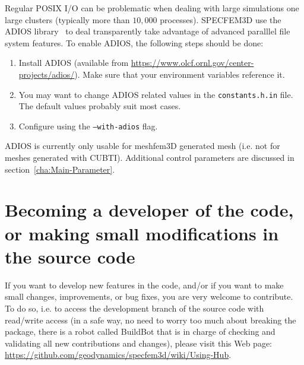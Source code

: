 Regular POSIX I/O can be problematic when dealing with large simulations one large
clusters (typically more than $10,000$ processes). SPECFEM3D use the ADIOS library~\cite{Liu2013}
to deal transparently take advantage of advanced paralllel file system features. To enable
ADIOS, the following steps should be done:
\begin{enumerate}
\item Install ADIOS (available from \url{https://www.olcf.ornl.gov/center-projects/adios/}).
Make sure that your environment variables reference it.
\item You may want to change ADIOS related values in the \texttt{constants.h.in} file.
The default values probably suit most cases.
\item Configure using the \texttt{--with-adios} flag.
\end{enumerate}
ADIOS is currently only usable for meshfem3D generated mesh (i.e. not for meshes generated
with CUBTI). Additional control parameters are discussed in section~\ref{cha:Main-Parameter}.

\section{Becoming a developer of the code, or making small modifications in the source code}

If you want to develop new features in the code, and/or if you want to make small changes, improvements, or bug fixes, you are very welcome to contribute. To do so, i.e. to access the development branch of the source code with read/write access (in a safe way, no need to worry too much about breaking the package, there is a robot called BuildBot that is in charge of checking and validating all new contributions and changes), please visit this Web page: \url{https://github.com/geodynamics/specfem3d/wiki/Using-Hub}.


